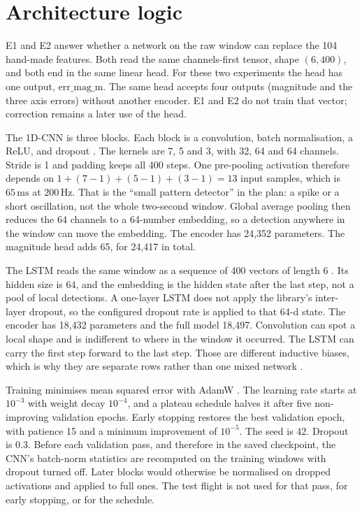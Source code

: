 \section{Architecture logic}
E1 and E2 answer whether a network on the raw window can replace the 104 hand-made features. Both read the same channels-first tensor, shape $(6,400)$, and both end in the same linear head. For these two experiments the head has one output, $\mathrm{err\_mag\_m}$. The same head accepts four outputs (magnitude and the three axis errors) without another encoder. E1 and E2 do not train that vector; correction remains a later use of the head.

The 1D-CNN is three blocks. Each block is a convolution, batch normalisation, a ReLU, and dropout \cite{ioffe2015,srivastava2014}. The kernels are 7, 5 and 3, with 32, 64 and 64 channels. Stride is 1 and padding keeps all 400 steps. One pre-pooling activation therefore depends on $1+(7-1)+(5-1)+(3-1)=13$ input samples, which is $65\,\mathrm{ms}$ at $200\,\mathrm{Hz}$. That is the ``small pattern detector'' in the plan: a spike or a short oscillation, not the whole two-second window. Global average pooling then reduces the 64 channels to a 64-number embedding, so a detection anywhere in the window can move the embedding. The encoder has 24{,}352 parameters. The magnitude head adds 65, for 24{,}417 in total.

The LSTM reads the same window as a sequence of 400 vectors of length 6 \cite{hochreiter1997}. Its hidden size is 64, and the embedding is the hidden state after the last step, not a pool of local detections. A one-layer LSTM does not apply the library's inter-layer dropout, so the configured dropout rate is applied to that 64-d state. The encoder has 18{,}432 parameters and the full model 18{,}497. Convolution can spot a local shape and is indifferent to where in the window it occurred. The LSTM can carry the first step forward to the last step. Those are different inductive biases, which is why they are separate rows rather than one mixed network \cite{ordonez2016,herath2020ronin}.

Training minimises mean squared error with AdamW \cite{loshchilov2019}. The learning rate starts at $10^{-3}$ with weight decay $10^{-4}$, and a plateau schedule halves it after five non-improving validation epochs. Early stopping restores the best validation epoch, with patience 15 and a minimum improvement of $10^{-5}$. The seed is 42. Dropout is 0.3. Before each validation pass, and therefore in the saved checkpoint, the CNN's batch-norm statistics are recomputed on the training windows with dropout turned off. Later blocks would otherwise be normalised on dropped activations and applied to full ones. The test flight is not used for that pass, for early stopping, or for the schedule.

